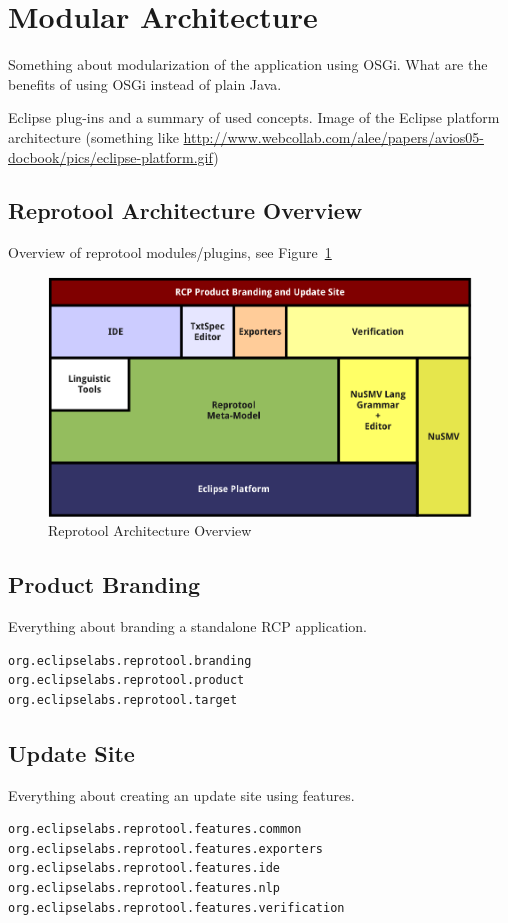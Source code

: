 \section{Modular Architecture}

Something about modularization of the application using OSGi.
What are the benefits of using OSGi instead of plain Java.

Eclipse plug-ins and a summary of used concepts.
Image of the Eclipse platform architecture (something like \url{http://www.webcollab.com/alee/papers/avios05-docbook/pics/eclipse-platform.gif})
	


\subsection{Reprotool Architecture Overview}
Overview of reprotool modules/plugins, see Figure~\ref{fig:ArchitectureOverview}
	
\begin{figure}[ht]
  \centering
  \includegraphics[width=\textwidth]{images/ArchitectureOverview}
  \caption{Reprotool Architecture Overview}
  \label{fig:ArchitectureOverview}
\end{figure}



\subsection{Product Branding}
Everything about branding a standalone RCP application.
\begin{verbatim}
org.eclipselabs.reprotool.branding
org.eclipselabs.reprotool.product
org.eclipselabs.reprotool.target
\end{verbatim}



\subsection{Update Site}
Everything about creating an update site using features.
\begin{verbatim}
org.eclipselabs.reprotool.features.common
org.eclipselabs.reprotool.features.exporters
org.eclipselabs.reprotool.features.ide
org.eclipselabs.reprotool.features.nlp
org.eclipselabs.reprotool.features.verification
\end{verbatim}